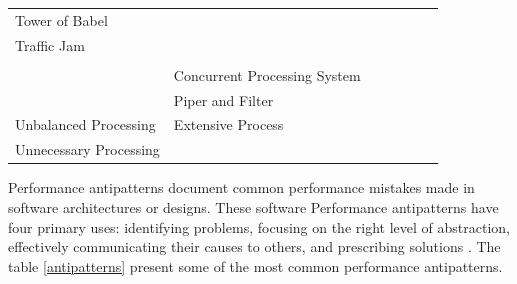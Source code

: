 \documentclass{report}
\begin{document}
\begin{table}[]
\begin{tabular}{|l|l|l|llll}
Tower of Babel                          &                              & \cite{Trubiani2011} \cite{Vetoio2011}                                                                          &  &  &  &  \\ \cline{1-1} \cline{3-3}
Traffic Jam                             & \multirow{-10}{*}{}          & \cite{Vetoio2011} \cite{Smith2003} \cite{Smith2002}                                                            &  &  &  &  \\ \cline{1-3}
                                        &                              & \cite{Cortellessa2007} \cite{Trubiani2011} \cite{Smith2003}                                                    &  &  &  &  \\ \cline{2-3}
                                        & Concurrent Processing System & \cite{Vetoio2011} \cite{Smith2003}                                                                             &  &  &  &  \\ \cline{2-3}
                                        & Piper and Filter             & \cite{Vetoio2011} \cite{Smith2003}                                                                             &  &  &  &  \\ \cline{2-3}
\multirow{-4}{*}{Unbalanced Processing} & Extensive Process            & \cite{Vetoio2011} \cite{Smith2003}                                                                             &  &  &  &  \\ \cline{1-3}
Unnecessary Processing                  &                              & \cite{Smith2003}                                                                                               &  &  &  &  \\ \cline{1-3}
\end{tabular}
\end{table}




Performance antipatterns document common performance mistakes made in software architectures or designs. These software Performance antipatterns have four primary uses: identifying problems,
focusing on the
right level of abstraction,
effectively communicating
their causes to others, and prescribing solutions \cite{brown1998antipatterns}. The table \ref{antipatterns} present some of the most common performance antipatterns.
\end{document}
